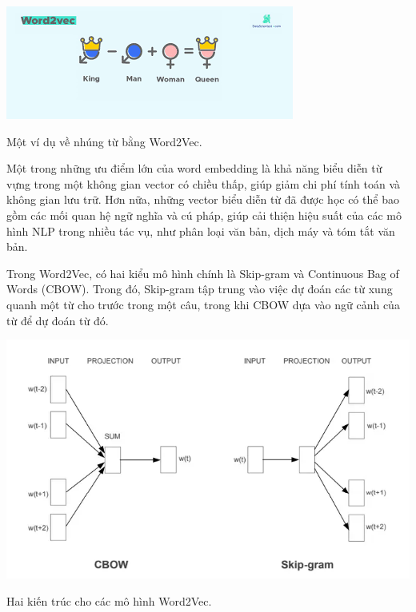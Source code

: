 \documentclass[a4paper, 12pt, openany]{book}
\begin{document}
\begin{minipage}{\linewidth}
    \captionsetup{type=figure}
    \centering
    \includegraphics[width=.8\linewidth]{./assets/images/word2vec-intro.png}
    \caption{Một ví dụ về nhúng từ bằng Word2Vec.}
\end{minipage}
\vspace{0.5cm}

Một trong những ưu điểm lớn của word embedding là khả năng biểu diễn từ vựng trong một không gian vector có chiều thấp, giúp giảm chi phí tính toán và không gian lưu trữ. Hơn nữa, những vector biểu diễn từ đã được học có thể bao gồm các mối quan hệ ngữ nghĩa và cú pháp, giúp cải thiện hiệu suất của các mô hình NLP trong nhiều tác vụ, như phân loại văn bản, dịch máy và tóm tắt văn bản.

Trong Word2Vec, có hai kiểu mô hình chính là Skip-gram và Continuous Bag of Words (CBOW). Trong đó, Skip-gram tập trung vào việc dự đoán các từ xung quanh một từ cho trước trong một câu, trong khi CBOW dựa vào ngữ cảnh của từ để dự đoán từ đó.

\begin{minipage}{\linewidth}
    \captionsetup{type=figure}
    \centering
    \includegraphics[width=\linewidth]{./assets/images/word2vec.png}
    \caption{Hai kiến trúc cho các mô hình Word2Vec.}
\end{minipage}
\vspace{0.5cm}
\end{document}
